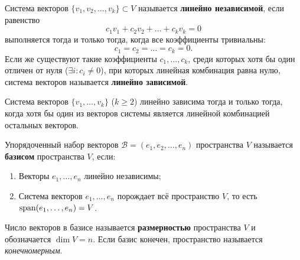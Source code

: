 \begin{definition}
Система векторов $\{v_1, v_2, \dots, v_k\} \subset V$ называется \textbf{линейно независимой}, если равенство
\[ c_1 v_1 + c_2 v_2 + \dots + c_k v_k = 0 \]
выполняется тогда и только тогда, когда все коэффициенты тривиальны:
\[ c_1 = c_2 = \dots = c_k = 0. \]
Если же существуют такие коэффициенты $c_1, \dots, c_k$, среди которых хотя бы один отличен от нуля ($ \exists i \colon
c_i \ne 0 $), при которых линейная комбинация равна нулю, система векторов называется \textbf{линейно зависимой}.
\end{definition}

\begin{proposition}
Система векторов $\{v_1, \dots, v_k\}$ ($k \ge 2$) линейно зависима тогда и только тогда, когда хотя бы один из векторов
системы является линейной комбинацией остальных векторов.
\end{proposition}

\begin{definition}
Упорядоченный набор векторов $\mathcal{B} = (e_1, e_2, \dots, e_n)$ пространства $V$ называется \textbf{базисом}
пространства $V$, если:
\begin{enumerate}
    \item Векторы $e_1, \dots, e_n$ линейно независимы;
    \item Система векторов $e_1, \dots, e_n$ порождает всё пространство $V$, то есть $\operatorname{span}(e_1, \dots, e_n) = V$.
\end{enumerate}
Число векторов в базисе называется \textbf{размерностью} пространства $V$ и обозначается $\dim V = n$.
Если базис конечен, пространство называется \emph{конечномерным}.
\end{definition}

